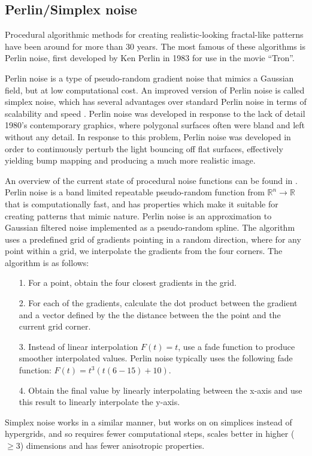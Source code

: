 \documentclass[aps,pre,twocolumn,letterpaper,floatfix,showpacs]{revtex4}
\begin{document}
\subsection{Perlin/Simplex noise}
\label{sec:perlin}

Procedural algorithmic methods for creating realistic-looking
fractal-like patterns have been around for more than 30 years. The most famous of these
algorithms is Perlin noise, first developed by Ken Perlin in 1983 for
use in the movie ``Tron''\cite{perlin1985image}. 

Perlin noise is a type of pseudo-random gradient noise that mimics a Gaussian field, but at low computational cost. An improved version of Perlin noise is called simplex noise, which has several advantages over standard Perlin noise in terms of scalability and speed \cite{perlin:2002}. Perlin noise was developed in response to the lack of detail 1980's contemporary graphics, where polygonal surfaces often were bland and left without any detail. In response to this problem, Perlin noise was developed in order to continuously perturb the light bouncing off flat surfaces, effectively yielding bump mapping and producing a much more realistic image. 

An overview of the current state of procedural noise functions can be
found in \cite{lagae:2010}. Perlin noise is a band limited repeatable pseudo-random function
from $\mathbb R^n \to \mathbb R$ that is computationally fast, and has
properties which make it suitable for creating patterns that mimic
nature. Perlin noise is an approximation to Gaussian filtered noise
implemented as a pseudo-random spline. The algorithm uses a predefined
grid of gradients pointing in a random direction, where for any point
within a grid, we interpolate the gradients from the four corners. The
algorithm is as follows:
\begin{itemize}
  \item[1.] For a point, obtain the four closest gradients in the grid.
   \item [2.] For each of the gradients, calculate the dot product
     between the gradient and a vector defined by the  the distance
     between the the point and the current grid corner. 
   \item [3.] Instead of linear interpolation $F(t) = t$, use a fade function to produce smoother interpolated values. Perlin noise typically uses the following fade function: $F(t) = t ^3 (t  (6 - 15) + 10)$.
    \item [4.] Obtain the final value by linearly interpolating between the x-axis and
      use this result to linearly interpolate the y-axis. 
\end{itemize} 
Simplex noise works in a similar manner, but works on on simplices instead of hypergrids, and so requires fewer computational steps, scales better in higher ($\ge 3$) dimensions and has fewer anisotropic properties. 
\end{document}
